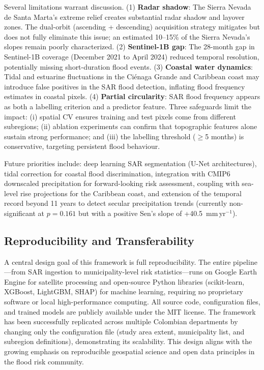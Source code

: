 \documentclass{article}
\begin{document}
Several limitations warrant discussion. (1) \textbf{Radar shadow}: The Sierra Nevada de Santa Marta's extreme relief creates substantial radar shadow and layover zones. The dual-orbit (ascending + descending) acquisition strategy mitigates but does not fully eliminate this issue; an estimated 10--15\% of the Sierra Nevada's slopes remain poorly characterized. (2) \textbf{Sentinel-1B gap}: The 28-month gap in Sentinel-1B coverage (December 2021 to April 2024) reduced temporal resolution, potentially missing short-duration flood events. (3) \textbf{Coastal water dynamics}: Tidal and estuarine fluctuations in the Ci\'enaga Grande and Caribbean coast may introduce false positives in the SAR flood detection, inflating flood frequency estimates in coastal pixels. (4) \textbf{Partial circularity}: SAR flood frequency appears as both a labelling criterion and a predictor feature. Three safeguards limit the impact: (i) spatial CV ensures training and test pixels come from different subregions; (ii) ablation experiments can confirm that topographic features alone sustain strong performance; and (iii) the labelling threshold ($\geq$5 months) is conservative, targeting persistent flood behaviour.

Future priorities include: deep learning SAR segmentation (U-Net architectures), tidal correction for coastal flood discrimination, integration with CMIP6 downscaled precipitation for forward-looking risk assessment, coupling with sea-level rise projections for the Caribbean coast, and extension of the temporal record beyond 11 years to detect secular precipitation trends (currently non-significant at $p = 0.161$ but with a positive Sen's slope of +40.5~mm\,yr$^{-1}$).

\subsection{Reproducibility and Transferability}

A central design goal of this framework is full reproducibility. The entire pipeline---from SAR ingestion to municipality-level risk statistics---runs on Google Earth Engine for satellite processing and open-source Python libraries (scikit-learn, XGBoost, LightGBM, SHAP) for machine learning, requiring no proprietary software or local high-performance computing. All source code, configuration files, and trained models are publicly available under the MIT license. The framework has been successfully replicated across multiple Colombian departments by changing only the configuration file (study area extent, municipality list, and subregion definitions), demonstrating its scalability. This design aligns with the growing emphasis on reproducible geospatial science and open data principles in the flood risk community.
\end{document}
